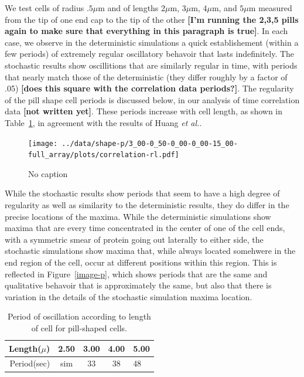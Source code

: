 \documentclass[letterpaper,twocolumn,amsmath,amssymb,pre]{revtex4-1}
\newcommand{\red}[1]{{\bf \color{red} #1}}
\newcommand{\fixme}[1]{\red{[#1]}}
\newcommand\micron{\ensuremath{\mu\text{m}}}
\begin{document}
We test cells of radius $.5\micron$ and of lengths $2\micron$,
$3\micron$, $4\micron$, and $5\micron$ measured from the tip of one
end cap to the tip of the other \fixme{I'm running the 2,3,5 pills
  again to make sure that everything in this paragraph is true}. In
each case, we observe in the deterministic simulations a quick
establishement (within a few periods) of extremely regular oscillatory
behavoir that lasts indefinitely.  The stochastic results show
oscillitions that are similarly regular in time, with periods that
nearly match those of the deterministic (they differ roughly by a
factor of .05) \fixme{does this square with the correlation data
  periods?}. The regularity of the pill shape cell periods is
discussed below, in our analysis of time correlation data \fixme{not
  written yet}.  These periods increase with cell length, as shown in
Table~\ref{tab:pill-periods}, in agreement with the results of Huang
\emph{et al.}.

\begin{figure}
  \texttt{[image: ../data/shape-p/3\_00-0\_50-0\_00-0\_00-15\_00-full\_array/plots/correlation-rl.pdf]}
  \caption{No caption}
  \label{corr-pill}
\end{figure}

While the stochastic results show periods that seem to have a high
degree of regularity as well as similarity to the deterministic
results, they do differ in the precise locations of the maxima.  While
the deterministic simulations show maxima that are every time
concentrated in the center of one of the cell ends, with a symmetric
smear of protein going out laterally to either side, the stochastic
simulations show maxima that, while always located somehwere in the
end region of the cell, occur at different positions within this
region.  This is reflected in Figure~\ref{image-p}, which shows
periods that are the same and qualitative behavoir that is
approximately the same, but also that there is variation in the
details of the stochastic simulation maxima location.

\begin{table}
  \begin{tabular}{|r|c|c|c|l|}
    \hline Length($\mu$) & 2.50 & 3.00 & 4.00 & 5.00\\ \hline
    Period(sec) & sim & 33 & 38 & 48 \\ \cline{2-2} \hline
  \end{tabular}
  \caption{Period of oscillation according to length of cell for
    pill-shaped cells.}\label{tab:pill-periods}
\end{table}
\end{document}
